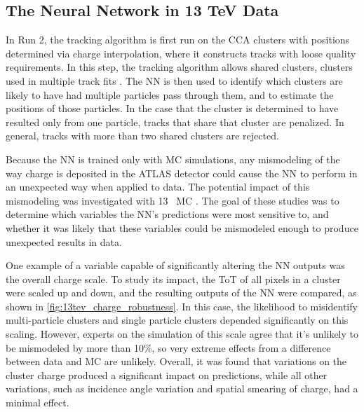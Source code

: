 \subsection{The Neural Network in 13 TeV Data}

In Run 2, the tracking algorithm is first run on the \ac{CCA} clusters with positions determined via charge interpolation, where it constructs tracks with loose quality requirements. In this step, the tracking algorithm allows shared clusters, clusters used in multiple track fits \cite{ATL-PHYS-PUB-2015-044}. The \ac{NN} is then used to identify which clusters are likely to have had multiple particles pass through them, and to estimate the positions of those particles. In the case that the cluster is determined to have resulted only from one particle, tracks that share that cluster are penalized. In general, tracks with more than two shared clusters are rejected.

Because the \ac{NN} is trained only with \ac{MC} simulations, any mismodeling of the way charge is deposited in the \ac{ATLAS} detector could cause the \ac{NN} to perform in an unexpected way when applied to data. The potential impact of this mismodeling was investigated with 13 \tev~\ac{MC} \cite{ATL-PHYS-PUB-2015-052}. The goal of these studies was to determine which variables the \ac{NN}'s predictions were most sensitive to, and whether it was likely that these variables could be mismodeled enough to produce unexpected results in data. 

One example of a variable capable of significantly altering the \ac{NN} outputs was the overall charge scale. To study its impact, the \ac{ToT} of all pixels in a cluster were scaled up and down, and the resulting outputs of the \ac{NN} were compared, as shown in \autoref{fig:13tev_charge_robustness}. In this case, the likelihood to misidentify multi-particle clusters and single particle clusters depended significantly on this scaling. However, experts on the simulation of this scale agree that it's unlikely to be mismodeled by more than 10\%, so very extreme effects from a difference between data and \ac{MC} are unlikely. Overall, it was found that variations on the cluster charge produced a significant impact on predictions, while all other variations, such as incidence angle variation and spatial smearing of charge, had a minimal effect. 

